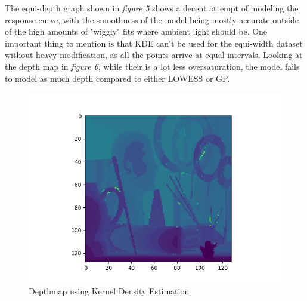 \documentclass[letterpaper,12pt]{article}
\begin{document}
The equi-depth graph shown in \emph{figure 5} shows a decent attempt of modeling the response
curve, with the smoothness of the model being mostly accurate outside of the high amounts
of "wiggly" fits where ambient light should be. One important thing to mention is that 
KDE can't be used for the equi-width dataset without heavy modification, as all the points
arrive at equal intervals. Looking at the depth map in \emph{figure 6}, while their is a lot
less oversaturation, the model fails to model as much depth compared to either LOWESS or GP.
\begin{figure}[H]
\centering
\includegraphics{kde_depthmap}
\caption{Depthmap using Kernel Density Estimation}
\end{figure}
\end{document}
